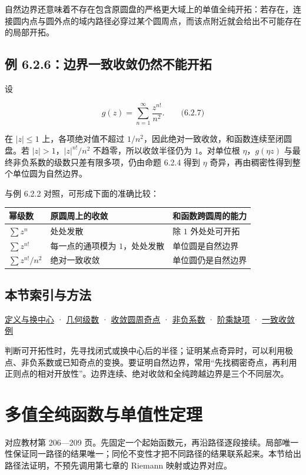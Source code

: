 \documentclass[11pt,a4paper]{article}
\begin{document}
自然边界还意味着不存在包含原圆盘的严格更大域上的单值全纯开拓：若存在，连接圆内点与圆外点的域内路径必穿过某个圆周点，而该点附近就会给出不可能存在的局部开拓。

\subsection{例 6.2.6：边界一致收敛仍然不能开拓}\label{ch06-s2-heading-6}

设

\[
g(z)=\sum_{n=1}^{\infty}\frac{z^{n!}}{n^2}.\qquad\text{(6.2.7)}
\]

在 \(|z|\le1\) 上，各项绝对值不超过
\(1/n^2\)，因此绝对一致收敛，和函数连续至闭圆盘。若
\(|z|>1\)，\(|z|^{n!}/n^2\) 不趋零，所以收敛半径仍为 \(1\)。对单位根
\(\eta\)，\(g(\eta z)\) 与最终非负系数的级数只差有限多项，仍由命题 6.2.4
得到 \(\eta\) 奇异，再由稠密性得到整个单位圆为自然边界。

与例 6.2.2 对照，可形成下面的准确比较：

\begin{longtable}[]{@{}lll@{}}
\toprule\noalign{}
幂级数 & 原圆周上的收敛 & 和函数跨圆周的能力 \\
\midrule\noalign{}
\endhead
\bottomrule\noalign{}
\endlastfoot
\(\sum z^n\) & 处处发散 & 除 \(1\) 外处处可开拓 \\
\(\sum z^{n!}\) & 每一点的通项模为 \(1\)，处处发散 & 单位圆是自然边界 \\
\(\sum z^{n!}/n^2\) & 绝对一致收敛 & 单位圆仍是自然边界 \\
\end{longtable}

\subsection{本节索引与方法}\label{ch06-s2-heading-7}

\hyperref[ch06-s2-heading-1]{定义与换中心} · \hyperref[ch06-s2-heading-2]{几何级数} ·
\hyperref[ch06-s2-heading-3]{收敛圆周奇点} · \hyperref[ch06-s2-heading-4]{非负系数} ·
\hyperref[ch06-s2-heading-5]{阶乘缺项} · \hyperref[ch06-s2-heading-6]{一致收敛例}

判断可开拓性时，先寻找闭式或换中心后的半径；证明某点奇异时，可以利用极点、非负系数或已知奇点的变换。要证明自然边界，常用``先找稠密奇点，再利用正则点的相对开放性''。边界连续、绝对收敛和全纯跨越边界是三个不同层次。

\section{多值全纯函数与单值性定理}
对应教材第 206---209
页。先固定一个起始函数元，再沿路径逐段接续。局部唯一性保证同一路径的结果唯一；同伦不变性才把不同路径的结果联系起来。本节给出路径法证明，不预先调用第七章的
Riemann 映射或边界对应。
\end{document}
